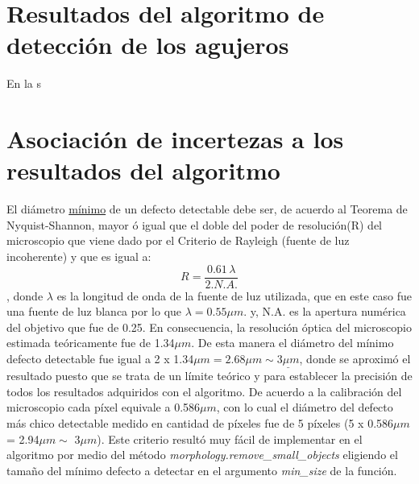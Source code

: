 \singlespacing
\section{Resultados del algoritmo de detección de los agujeros}

\hspace{0.5cm} En la s


\singlespacing
\section{Asociación de incertezas a los resultados del algoritmo}

\hspace{0.5cm} El diámetro \underline{mínimo} de un defecto detectable debe ser, de acuerdo al Teorema de Nyquist-Shannon, mayor ó igual que el doble del poder de resolución(R) del microscopio que viene dado por el Criterio de Rayleigh (fuente de luz incoherente) y que es igual a:
\begin{equation}
R = \frac{0.61 \hspace{2pt} \lambda}{2 . N.A.}
\end{equation},
donde $\lambda$ es la longitud de onda de la fuente de luz utilizada, que en este caso fue una fuente de luz blanca por lo que $\lambda = 0.55 \mu m$. y, N.A. es la apertura numérica del objetivo que fue de 0.25. En consecuencia, la resolución óptica del microscopio estimada teóricamente fue de 1.34$\mu m$. De esta manera el diámetro del mínimo defecto detectable fue igual a 2 x 1.34$\mu m = 2.68 \mu m \sim \underline{3 \mu m}$, donde se aproximó el resultado puesto que se trata de un límite teórico y para establecer la precisión de todos los resultados adquiridos con el algoritmo. De acuerdo a la calibración del microscopio cada píxel equivale a 0.586$\mu m$, con lo cual el diámetro del defecto más chico detectable medido en cantidad de píxeles fue de 5 píxeles (5 x 0.586$\mu m$ = 2.94$\mu m \sim$ 3$\mu m$). Este criterio resultó muy fácil de implementar en el algoritmo por medio del método \textit{morphology.remove\_small\_objects} eligiendo el tamaño del mínimo defecto a detectar en el argumento \textit{min\_size} de la función.

